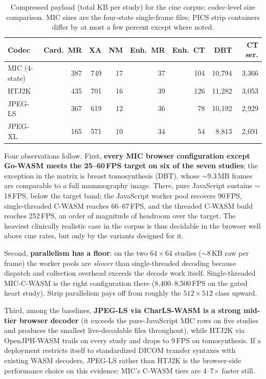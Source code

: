 \documentclass[journal]{IEEEtran}
\begin{document}
\begin{table}[htbp]
\centering
\caption{Compressed payload (total KB per study) for the cine corpus:
codec-level size comparison. MIC sizes are the four-state single-frame
files; PICS strip containers differ by at most a few percent except where
noted.}
\label{tab:cine-sizes}
\scriptsize
\setlength{\tabcolsep}{3pt}
\begin{tabular}{lrrrrrrr}
\toprule
Codec & Card.\ MR & XA & NM & Enh.\ MR & Enh.\ CT & DBT & CT ser. \\
\midrule
MIC (4-state) & 387 & 749 & 17 & 37 & 104 & 10{,}794 & 3{,}366 \\
HTJ2K         & 435 & 701 & 16 & 39 & 126 & 11{,}282 & 3{,}053 \\
JPEG-LS       & 367 & 619 & 12 & 36 & 78  & 10{,}192 & 2{,}929 \\
JPEG-XL       & 165 & 571 & 10 & 34 & 54  & 8{,}813  & 2{,}691 \\
\bottomrule
\end{tabular}
\end{table}

Four observations follow. First, \textbf{every MIC browser configuration
except Go-WASM meets the 25--60\,FPS target on six of the seven studies};
the exception in the matrix is breast tomosynthesis (DBT), whose
${\sim}$9.3\,MB frames are comparable to a full mammography image. There,
pure JavaScript sustains ${\sim}$18\,FPS, below the target band; the
JavaScript worker pool recovers 90\,FPS, single-threaded C-WASM reaches
66--67\,FPS, and the threaded C-WASM build reaches 252\,FPS, an order of
magnitude of headroom over the target. The heaviest clinically realistic
case in the corpus is thus decidable in the browser well above cine rates,
but only by the variants designed for it.

Second, \textbf{parallelism has a floor}: on the two $64{\times}64$ studies
(${\sim}$8\,KB raw per frame) the worker pools are \emph{slower} than
single-threaded decoding because dispatch and collection overhead exceeds
the decode work itself. Single-threaded MIC-C-WASM is the right
configuration there (8,400--8,500\,FPS on the gated heart study). Strip
parallelism pays off from roughly the $512{\times}512$ class upward.

Third, among the baselines, \textbf{JPEG-LS via CharLS-WASM is a strong
mid-tier browser decoder} (it exceeds the pure-JavaScript MIC rows on five
studies and produces the smallest live-decodable files throughout), while
HTJ2K via OpenJPH-WASM trails on every study and drops to 9\,FPS on
tomosynthesis. If a deployment restricts itself to standardized DICOM
transfer syntaxes with existing WASM decoders, JPEG-LS rather than HTJ2K is
the browser-side performance choice on this evidence; MIC's C-WASM tiers
are 4--7$\times$ faster still.
\end{document}
